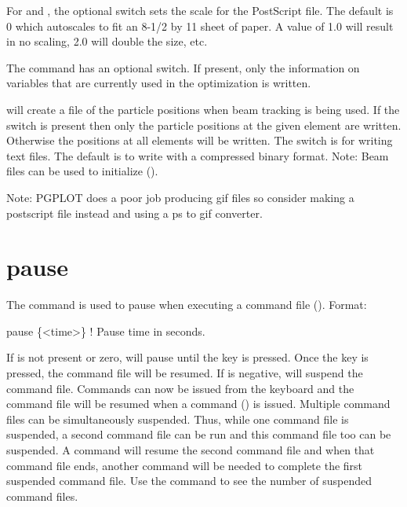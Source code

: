 For  and , the optional  switch sets the
scale for the PostScript file. The default is 0 which autoscales to fit an
8-1/2 by 11 sheet of paper. A value of 1.0 will result in no scaling,
2.0 will double the size, etc.

The  command has an optional 
switch.  If present, only the information on variables that are
currently used in the optimization is written.

 will create a file of the particle positions when
beam tracking is being used. If the switch  is present then
only the particle positions at the given element are written. 
Otherwise the positions at all elements will be written. The
 switch is for writing text files. The default is to write
with a compressed binary format.  Note: Beam files can be used to
initialize \tao (). 

Note: PGPLOT does a poor job producing gif files so consider
making a postscript file instead and using a ps to gif converter.

\section{pause}
\label{s:pause}

The  command is used to pause \tao when executing a command
file (). Format:
\begin{example}
  pause \{<time>\} ! Pause time in seconds.
\end{example}
\vskip 0.2in

If  is not present or zero, \tao will pause until the
 key is pressed. Once the  key is pressed, the command
file will be resumed. If  is negative, \tao will suspend
the command file. Commands can now be issued from the keyboard and the
command file will be resumed when a  command
() is issued. Multiple command files can be
simultaneously suspended.  Thus, while one command file is suspended, a
second command file can be run and this command file too can be
suspended. A  command will resume the second command file
and when that command file ends, another  command will be
needed to complete the first suspended command file. Use the  command to see the number of suspended command files.

